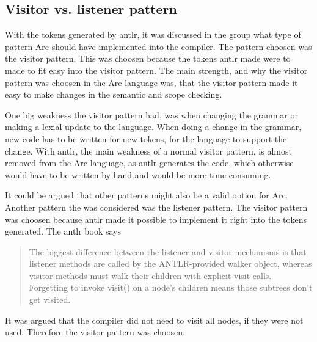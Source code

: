 \subsection{Visitor vs. listener pattern}

With the tokens generated by \gls{antlr}, it was discussed in the group what type of pattern Arc should have implemented into the compiler. The pattern choosen was the visitor pattern. This was choosen because the tokens \gls{antlr} made were to made to fit easy into the visitor pattern.
The main strength, and why the visitor pattern was choosen in the Arc language was, that the visitor pattern made it easy to make changes in the semantic and scope checking. 

One big weakness the visitor pattern had, was when changing the grammar or making a lexial update to the language. When doing a change in the grammar, new code has to be written for new tokens, for the language to support the change. With \gls{antlr}, the main weakness of a normal visitor pattern, is almost removed from the Arc language, as \gls{antlr} generates the code, which otherwise would have to be written by hand and would be more time consuming. 


It could be argued that other patterns might also be a valid option for Arc. Another pattern the was considered was the listener pattern. The visitor pattern was choosen because \gls{antlr} made it possible to implement it right into the tokens generated. The \gls{antlr} book says \begin{quote}
    The biggest difference between the listener and visitor mechanisms is that listener methods are called by the ANTLR-provided walker object, whereas visitor methods must walk their children with explicit visit calls. Forgetting to invoke visit() on a node’s children means those subtrees don’t get visited. \cite{Parr2014}
\end{quote}
It was argued that the compiler did not need to visit all nodes, if they were not used. Therefore the visitor pattern was choosen.
 






